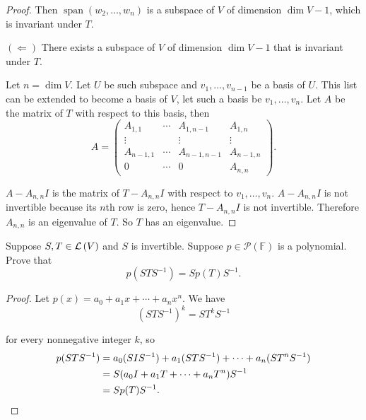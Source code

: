 \begin{proof}
    Then $\operatorname{span}(w_{2}, \ldots, w_{n})$ is a subspace of $V$ of dimension $\dim V - 1$, which is invariant under $T$.

    $(\Leftarrow)$ There exists a subspace of $V$ of dimension $\dim V - 1$ that is invariant under $T$.

    Let $n = \dim V$. Let $U$ be such subspace and $v_{1}, \ldots, v_{n-1}$ be a basis of $U$. This list can be extended to become a basis of $V$, let such a basis be $v_{1}, \ldots, v_{n}$. Let $A$ be the matrix of $T$ with respect to this basis, then
    \[
        A = \begin{pmatrix}
            A_{1,1}   & \cdots & A_{1,n-1}   & A_{1,n}   \\
            \vdots    &        & \vdots      & \vdots    \\
            A_{n-1,1} & \cdots & A_{n-1,n-1} & A_{n-1,n} \\
            0         & \cdots & 0           & A_{n,n}
        \end{pmatrix}.
    \]

    $A - A_{n,n}I$ is the matrix of $T - A_{n,n}I$ with respect to $v_{1}, \ldots, v_{n}$. $A - A_{n,n}I$ is not invertible because its $n$th row is zero, hence $T - A_{n,n}I$ is not invertible. Therefore $A_{n,n}$ is an eigenvalue of $T$. So $T$ has an eigenvalue.
\end{proof}
\newpage

\begin{exercise}\label{chapter5:sectionA:exercise40}
    Suppose $S,T\in\mathcal{L}\left({V}\right)$ and $S$ is invertible. Suppose $p\in\mathscr{P}(\mathbb{F})$ is a polynomial. Prove that
    \[
        p(STS^{-1}) = Sp(T)S^{-1}.
    \]
\end{exercise}

\begin{proof}
    Let $p(x) = a_{0} + a_{1}x + \cdots + a_{n}x^{n}$. We have
    \[
        {(STS^{-1})}^{k} = ST^{k}S^{-1}
    \]

    for every nonnegative integer $k$, so
    \begin{align*}
        p(STS^{-1}) & = a_{0}(SIS^{-1}) + a_{1}(STS^{-1}) + \cdots + a_{n}(ST^{n}S^{-1}) \\
                    & = S(a_{0}I + a_{1}T + \cdots + a_{n}T^{n})S^{-1}                   \\
                    & = Sp(T)S^{-1}.\qedhere
    \end{align*}
\end{proof}
\newpage

